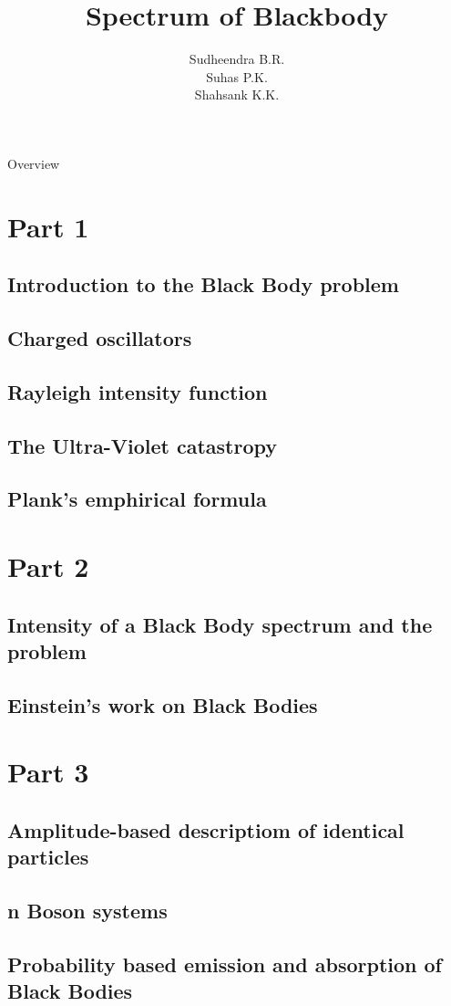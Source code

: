 \documentclass[aspectratio=169]{beamer}
\title{Spectrum of Blackbody}
\institute{Yuvaraja's College, Mysuru}
\author{Sudheendra B.R. \\ Suhas P.K. \\ Shahsank K.K.}
\begin{document}
\begin{frame}[noframenumbering]
\titlepage
\end{frame}

\begin{frame}[noframenumbering]{Overview}
\end{frame}

\section{Part 1}
\subsection{Introduction to the Black Body problem} 
 
\subsection{Charged oscillators}
 
\subsection{Rayleigh intensity function}
 
\subsection{The Ultra-Violet catastropy} 

\subsection{Plank's emphirical formula}

\section{Part 2}
\subsection{Intensity of a Black Body spectrum and the problem}

\subsection{Einstein's work on Black Bodies}

\section{Part 3}

\subsection{Amplitude-based descriptiom of identical particles}

\subsection{n Boson systems}

\subsection{Probability based emission and absorption of Black Bodies}
\end{document}
